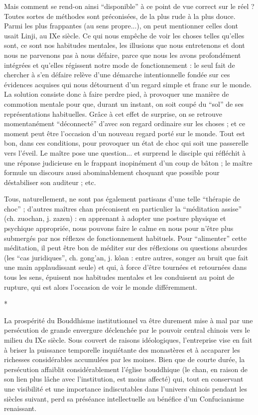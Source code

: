 \documentclass[11pt,a4paper]{article} %
\begin{document}
Mais comment se rend-on ainsi ``disponible'' à ce point de vue correct sur le réel ?
Toutes sortes de méthodes sont préconisées, de la plus rude à la plus douce.
Parmi les
plus frappantes (au sens propre...), on peut mentionner celles dont usait Linji, au IXe
siècle.
Ce qui nous empêche de voir les choses telles qu'elles sont, ce sont nos habitudes
mentales, les illusions que nous entretenons et dont nous ne parvenons pas à nous défaire, parce que nous les avons profondément intégrées et qu'elles régissent notre mode
de fonctionnement : le seul fait de chercher à s'en défaire relève d'une démarche intentionnelle fondée sur ces évidences acquises qui nous détournent d'un regard simple et
franc sur le monde.
La solution consiste donc à faire perdre pied, à provoquer une manière de commotion mentale pour que, durant un instant, on soit coupé du ``sol'' de ses
représentations habituelles.
Grâce à cet effet de surprise, on se retrouve momentanément
``déconnecté'' d'avec son regard ordinaire sur les choses ; et ce moment peut être
l'occasion d'un nouveau regard porté sur le monde.
Tout est bon, dans ces conditions,
pour provoquer un état de choc qui soit une passerelle vers l'éveil.
Le maître pose une
question...
et surprend le disciple qui réfléchit à une réponse judicieuse en le frappant
inopinément d'un coup de bâton ; le maître formule un discours aussi abominablement
choquant que possible pour déstabiliser son auditeur ; etc.

Tous, naturellement, ne sont pas également partisans d'une telle ``thérapie de choc'' ;
d'autres maîtres chan préconisent en particulier la ``méditation assise'' (ch. zuochan, j.
zazen) : en apprenant à adopter une posture physique et psychique appropriée, nous
pouvons faire le calme en nous pour n'être plus submergés par nos réflexes de fonctionnement habituels.
Pour ``alimenter'' cette méditation, il peut être bon de méditer sur
des réflexions ou questions absurdes (les ``cas juridiques'', ch. gong'an, j. kôan : entre
autres, songer au bruit que fait une main applaudissant seule) et qui, à force d'être tournées et retournées dans tous les sens, épuisent nos habitudes mentales et les conduisent
au point de rupture, qui est alors l'occasion de voir le monde différemment.
\begin{center}*\end{center}
La prospérité du Bouddhisme institutionnel va être durement mise à mal par une persécution de grande envergure déclenchée par le pouvoir central chinois vers le milieu du
IXe siècle.
Sous couvert de raisons idéologiques, l'entreprise vise en fait à briser la
puissance temporelle inquiétante des monastères et à accaparer les richesses considérables accumulées par les moines.
Bien que de courte durée, la persécution affaiblit
considérablement l'église bouddhique (le chan, en raison de son lien plus lâche avec
l'institution, est moins affecté) qui, tout en conservant une visibilité et une importance
indiscutables dans l'univers chinois pendant les siècles suivant, perd sa préséance intellectuelle au bénéfice d'un Confucianisme renaissant.
\end{document}
